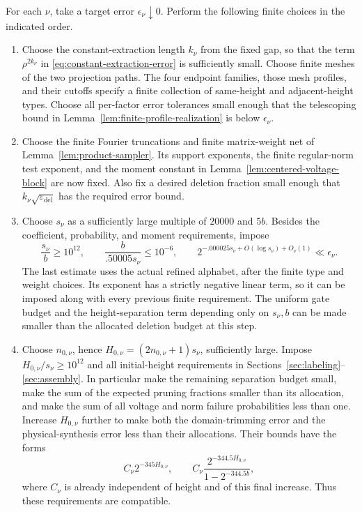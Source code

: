 For each $\nu$, take a target error $\epsilon_\nu\downarrow0$.
Perform the following finite choices in the indicated order.
\begin{enumerate}
\item Choose the constant-extraction length $k_\nu$ from the fixed
gap, so that the term $\rho^{2k_\nu}$ in
\eqref{eq:constant-extraction-error} is sufficiently small.
Choose finite meshes of the two projection paths.  The four endpoint
families, those mesh profiles, and their cutoffs specify a finite
collection of same-height and adjacent-height types.  Choose all
per-factor error tolerances small enough that the telescoping bound
in Lemma~\ref{lem:finite-profile-realization} is below
$\epsilon_\nu$.
\item Choose the finite Fourier truncations and finite matrix-weight
net of Lemma~\ref{lem:product-sampler}.  Its support exponents,
the finite regular-norm test exponent, and the moment constant in
Lemma~\ref{lem:centered-voltage-block} are now fixed.  Also fix a
desired deletion fraction small enough that
$k_\nu\sqrt{\varepsilon_{\mathrm{del}}}$ has the required
error bound.
\item Choose $s_\nu$ as a sufficiently large multiple of $20000$
and $5b$.  Besides the coefficient, probability, and moment
requirements, impose
\[
 \frac{s_\nu}{b}\geq10^{12},\qquad
 \frac b{.50005s_\nu}\leq10^{-6},\qquad
 2^{-.000025s_\nu+O(\log s_\nu)+O_\nu(1)}
       \ll\epsilon_\nu.
\]
The last estimate uses the actual refined alphabet, after the
finite type and weight choices.  Its exponent has a strictly
negative linear term, so it can be imposed along with every
previous finite requirement.  The uniform gate budget and the
height-separation term depending only on $s_\nu,b$ can be made
smaller than the allocated deletion budget at this step.
\item Choose $n_{0,\nu}$, hence
$H_{0,\nu}=(2n_{0,\nu}+1)s_\nu$, sufficiently large.  Impose
$H_{0,\nu}/s_\nu\geq10^{12}$ and all initial-height requirements
in Sections~\ref{sec:labeling}--\ref{sec:assembly}.  In
particular make the remaining separation budget small, make the
sum of the expected pruning fractions smaller than its allocation,
and make the sum of all voltage and norm failure probabilities
less than one.  Increase $H_{0,\nu}$ further to make both the
domain-trimming error and the physical-synthesis error less than
their allocations.  Their bounds have the forms
\[
 C_\nu2^{-345H_{0,\nu}},\qquad
 C_\nu\frac{2^{-344.5H_{0,\nu}}}{1-2^{-344.5b}},
\]
where $C_\nu$ is already independent of height and of this final
increase.  Thus these requirements are compatible.
\end{enumerate}

